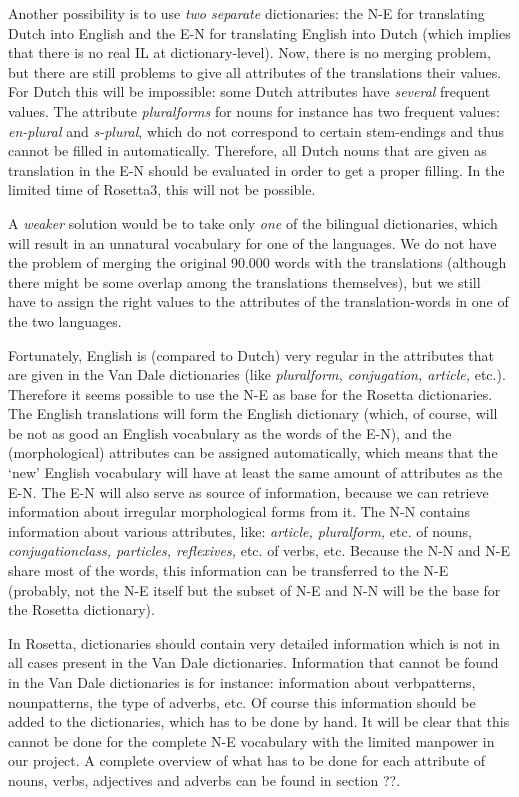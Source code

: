 Another possibility is to use {\em two separate} dictionaries: the N-E for 
translating Dutch into English and the E-N for translating English into Dutch
(which implies that there is no real IL at dictionary-level). Now, there is 
no merging problem, but there are still problems to give all attributes of the
translations their values. For Dutch this will be impossible: some Dutch 
attributes have {\em several} frequent values. 
The attribute {\em pluralforms} for nouns for instance has two frequent
values: {\em en-plural} and {\em s-plural}, which do not correspond to
certain stem-endings and thus cannot be filled in automatically. 
Therefore, all Dutch nouns that are given as translation 
in the E-N should be evaluated in order to get a proper filling.
In the limited time of Rosetta3, this will not be possible.

A {\em weaker} solution would be to take only {\em one} 
of the bilingual dictionaries,
which will result in an unnatural vocabulary for one of the languages. We
do not have the problem of merging the original 90.000 words with the 
translations (although there might be some overlap among the translations 
themselves), but we still have to assign the right values to the attributes 
of the translation-words in one of the two languages. 
 
Fortunately, English is (compared to Dutch) very regular
in the attributes that are given in the Van Dale dictionaries (like 
{\em pluralform, conjugation, article,} etc.).
Therefore it seems possible to use the N-E as base for the Rosetta 
dictionaries.
The English translations will form the English dictionary (which, of course,
will be not as good an English vocabulary as the words of the E-N), and the 
(morphological) attributes can be assigned automatically, which means that the 
`new' English vocabulary will have at least the same amount of attributes 
as the E-N.
The E-N will also serve as source of information, because we can retrieve 
information about irregular morphological forms from it.
The N-N contains information about various attributes, like: 
{\em article, pluralform,} etc. of nouns, 
{\em conjugationclass, particles, reflexives,} etc. of verbs, etc.
Because the N-N and N-E share most of the words, this information can be 
transferred to the N-E (probably, not the N-E itself but the subset of N-E 
and N-N will be the base for the Rosetta dictionary).

In Rosetta, dictionaries should contain very detailed information which is not
in all cases present in the Van Dale dictionaries. Information that cannot be 
found in the Van Dale dictionaries is for instance: 
information about verbpatterns, nounpatterns, the type of adverbs, etc.
Of course this information should be added to the dictionaries, which has to
be done by hand. It will be clear that this cannot be done for the complete
N-E vocabulary with the limited manpower in our project.
A complete overview of what has to be done for each attribute of nouns, 
verbs, adjectives and adverbs can be found in section ??.

